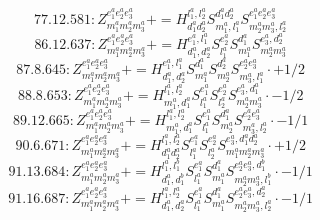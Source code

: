 \documentclass[letterpaper,10pt,fleqn,leqno,onecolumn]{article}
\begin{document}
\begin{equation} \;\;\;\;\;\;  77.12.581: Z^{e_{1}^{a}e_{2}^{a}e_{3}^{a}}_{m_{1}^{a}m_{2}^{a}m_{3}^{a}}+=H^{l_{1}^{a},l_{2}^{a}}_{d_{1}^{a}d_{2}^{a}}S^{d_{1}^{a}d_{2}^{a}}_{m_{1}^{a},l_{1}^{a}}S^{e_{1}^{a}e_{2}^{a}e_{3}^{a}}_{m_{2}^{a}m_{3}^{a},l_{2}^{a}} \end{equation}
\begin{equation} \;\;\;\;\;\;  86.12.637: Z^{e_{1}^{a}e_{2}^{a}e_{3}^{a}}_{m_{1}^{a}m_{2}^{a}m_{3}^{a}}+=H^{e_{1}^{a},l_{1}^{a}}_{d_{1}^{a},d_{2}^{a}}S^{e_{2}^{a}}_{l_{1}^{a}}S^{d_{1}^{a}}_{m_{1}^{a}}S^{e_{3}^{a},d_{2}^{a}}_{m_{2}^{a}m_{3}^{a}} \end{equation}
\begin{equation} \;\;\;\;\;\;  87.8.645: Z^{e_{1}^{a}e_{2}^{a}e_{3}^{a}}_{m_{1}^{a}m_{2}^{a}m_{3}^{a}}+=H^{e_{1}^{a},l_{1}^{a}}_{d_{1}^{a},d_{2}^{a}}S^{d_{1}^{a}}_{m_{1}^{a}}S^{d_{2}^{a}}_{m_{2}^{a}}S^{e_{2}^{a}e_{3}^{a}}_{m_{3}^{a},l_{1}^{a}}\cdot +1/2 \end{equation}
\begin{equation} \;\;\;\;\;\;  88.8.653: Z^{e_{1}^{a}e_{2}^{a}e_{3}^{a}}_{m_{1}^{a}m_{2}^{a}m_{3}^{a}}+=H^{l_{1}^{a},l_{2}^{a}}_{m_{1}^{a},d_{1}^{a}}S^{e_{1}^{a}}_{l_{1}^{a}}S^{e_{2}^{a}}_{l_{2}^{a}}S^{e_{3}^{a},d_{1}^{a}}_{m_{2}^{a}m_{3}^{a}}\cdot -1/2 \end{equation}
\begin{equation} \;\;\;\;\;\;  89.12.665: Z^{e_{1}^{a}e_{2}^{a}e_{3}^{a}}_{m_{1}^{a}m_{2}^{a}m_{3}^{a}}+=H^{l_{1}^{a},l_{2}^{a}}_{m_{1}^{a},d_{1}^{a}}S^{e_{1}^{a}}_{l_{1}^{a}}S^{d_{1}^{a}}_{m_{2}^{a}}S^{e_{2}^{a}e_{3}^{a}}_{m_{3}^{a},l_{2}^{a}}\cdot -1/1 \end{equation}
\begin{equation} \;\;\;\;\;\;  90.6.671: Z^{e_{1}^{a}e_{2}^{a}e_{3}^{a}}_{m_{1}^{a}m_{2}^{a}m_{3}^{a}}+=H^{l_{1}^{a},l_{2}^{a}}_{d_{1}^{a}d_{2}^{a}}S^{e_{1}^{a}}_{l_{1}^{a}}S^{e_{2}^{a}}_{l_{2}^{a}}S^{e_{3}^{a},d_{1}^{a}d_{2}^{a}}_{m_{1}^{a}m_{2}^{a}m_{3}^{a}}\cdot +1/2 \end{equation}
\begin{equation} \;\;\;\;\;\;  91.13.684: Z^{e_{1}^{a}e_{2}^{a}e_{3}^{a}}_{m_{1}^{a}m_{2}^{a}m_{3}^{a}}+=H^{l_{1}^{a},l_{1}^{b}}_{d_{1}^{a},d_{1}^{b}}S^{e_{1}^{a}}_{l_{1}^{a}}S^{d_{1}^{a}}_{m_{1}^{a}}S^{e_{2}^{a}e_{3}^{a},d_{1}^{b}}_{m_{2}^{a}m_{3}^{a},l_{1}^{b}}\cdot -1/1 \end{equation}
\begin{equation} \;\;\;\;\;\;  91.16.687: Z^{e_{1}^{a}e_{2}^{a}e_{3}^{a}}_{m_{1}^{a}m_{2}^{a}m_{3}^{a}}+=H^{l_{1}^{a},l_{2}^{a}}_{d_{1}^{a},d_{2}^{a}}S^{e_{1}^{a}}_{l_{1}^{a}}S^{d_{1}^{a}}_{m_{1}^{a}}S^{e_{2}^{a}e_{3}^{a},d_{2}^{a}}_{m_{2}^{a}m_{3}^{a},l_{2}^{a}}\cdot -1/1 \end{equation}
\end{document}
